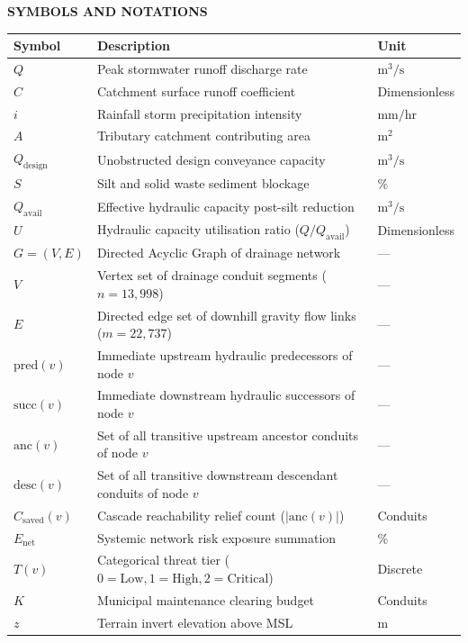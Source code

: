 \thispagestyle{plain}
\begin{center}
    {\fontsize{14pt}{18pt}\selectfont \textbf{SYMBOLS AND NOTATIONS}\par}
\end{center}
\vspace{0.8cm}

\begin{table}[h!]
\centering
\begin{tabular}{lll}
\textbf{Symbol} & \textbf{Description} & \textbf{Unit} \\
\hline
$Q$ & Peak stormwater runoff discharge rate & $\text{m}^3/\text{s}$ \\
$C$ & Catchment surface runoff coefficient & Dimensionless \\
$i$ & Rainfall storm precipitation intensity & $\text{mm}/\text{hr}$ \\
$A$ & Tributary catchment contributing area & $\text{m}^2$ \\
$Q_{\text{design}}$ & Unobstructed design conveyance capacity & $\text{m}^3/\text{s}$ \\
$S$ & Silt and solid waste sediment blockage & $\%$ \\
$Q_{\text{avail}}$ & Effective hydraulic capacity post-silt reduction & $\text{m}^3/\text{s}$ \\
$U$ & Hydraulic capacity utilisation ratio ($Q / Q_{\text{avail}}$) & Dimensionless \\
$G = (V, E)$ & Directed Acyclic Graph of drainage network & --- \\
$V$ & Vertex set of drainage conduit segments ($n = 13,998$) & --- \\
$E$ & Directed edge set of downhill gravity flow links ($m = 22,737$) & --- \\
$\text{pred}(v)$ & Immediate upstream hydraulic predecessors of node $v$ & --- \\
$\text{succ}(v)$ & Immediate downstream hydraulic successors of node $v$ & --- \\
$\text{anc}(v)$ & Set of all transitive upstream ancestor conduits of node $v$ & --- \\
$\text{desc}(v)$ & Set of all transitive downstream descendant conduits of node $v$ & --- \\
$C_{\text{saved}}(v)$ & Cascade reachability relief count ($|\text{anc}(v)|$) & Conduits \\
$E_{\text{net}}$ & Systemic network risk exposure summation & $\%$ \\
$T(v)$ & Categorical threat tier ($0 = \text{Low}, 1 = \text{High}, 2 = \text{Critical}$) & Discrete \\
$K$ & Municipal maintenance clearing budget & Conduits \\
$z$ & Terrain invert elevation above MSL & $\text{m}$ \\
\hline
\end{tabular}
\end{table}

\clearpage
